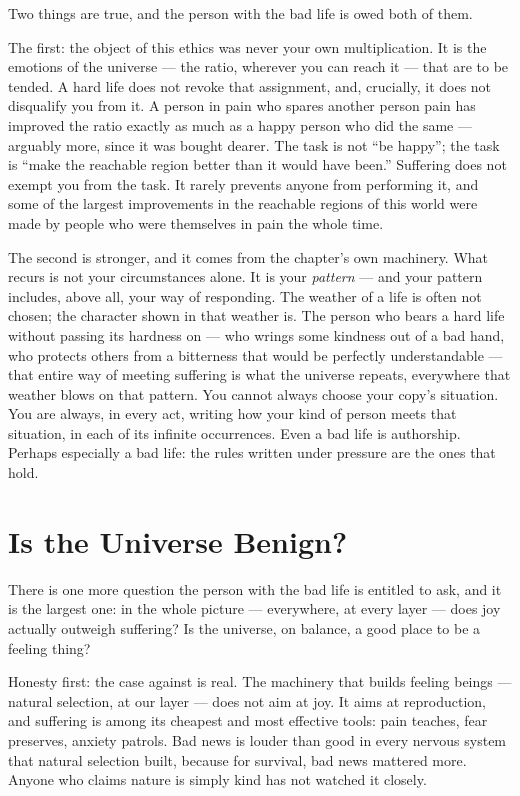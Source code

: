 \documentclass[fontsize=11pt,paper=a4,pagesize=auto,parskip=half-]{scrbook}
\begin{document}
Two things are true, and the person with the bad life is owed both of them.

The first: the object of this ethics was never your own multiplication. It is the emotions of the universe --- the ratio, wherever you can reach it --- that are to be tended. A hard life does not revoke that assignment, and, crucially, it does not disqualify you from it. A person in pain who spares another person pain has improved the ratio exactly as much as a happy person who did the same --- arguably more, since it was bought dearer. The task is not ``be happy''; the task is ``make the reachable region better than it would have been.'' Suffering does not exempt you from the task. It rarely prevents anyone from performing it, and some of the largest improvements in the reachable regions of this world were made by people who were themselves in pain the whole time.

The second is stronger, and it comes from the chapter's own machinery. What recurs is not your circumstances alone. It is your \emph{pattern} --- and your pattern includes, above all, your way of responding. The weather of a life is often not chosen; the character shown in that weather is. The person who bears a hard life without passing its hardness on --- who wrings some kindness out of a bad hand, who protects others from a bitterness that would be perfectly understandable --- that entire way of meeting suffering is what the universe repeats, everywhere that weather blows on that pattern. You cannot always choose your copy's situation. You are always, in every act, writing how your kind of person meets that situation, in each of its infinite occurrences. Even a bad life is authorship. Perhaps especially a bad life: the rules written under pressure are the ones that hold.

\section{Is the Universe Benign?}

There is one more question the person with the bad life is entitled to ask, and it is the largest one: in the whole picture --- everywhere, at every layer --- does joy actually outweigh suffering? Is the universe, on balance, a good place to be a feeling thing?

Honesty first: the case against is real. The machinery that builds feeling beings --- natural selection, at our layer --- does not aim at joy. It aims at reproduction, and suffering is among its cheapest and most effective tools: pain teaches, fear preserves, anxiety patrols. Bad news is louder than good in every nervous system that natural selection built, because for survival, bad news mattered more. Anyone who claims nature is simply kind has not watched it closely.
\end{document}

